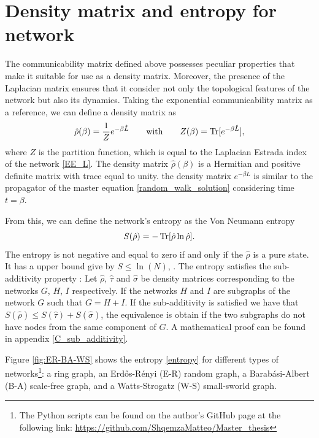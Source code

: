 \section{Density matrix and entropy for network}
The communicability matrix defined above possesses peculiar properties that make it suitable for use as a density matrix. Moreover, the presence of the Laplacian matrix ensures that it consider not only the topological features of the network but also its dynamics. Taking the exponential communicability matrix as a reference, we can define a density matrix as
\begin{equation}\label{density_matrix}
    \hat \rho(\beta) = \frac{1}{Z} e^{-\beta \hat L} \qquad \text{with} \qquad Z(\beta) = \operatorname{Tr}[e^{-\beta \hat L}],
\end{equation}
where $Z$ is the partition function, which is equal to the Laplacian Estrada index of the network \eqref{EE_L}.
The density matrix $\hat \rho(\beta)$ is a Hermitian and positive definite matrix with trace equal to unity. 
the density matrix $e^{-\beta L}$ is similar to the propagator of the master equation \eqref{random_walk_solution} considering time $t = \beta$.

From this, we can define the network's entropy as the Von Neumann entropy
\begin{equation} \label{entropy}
    S(\hat\rho) = -\operatorname{Tr}[\hat \rho \ln \hat \rho].
\end{equation}
The entropy is not negative and equal to zero if and only if the $\hat\rho$ is a pure state. It has a upper bound give by $S \leq \ln(N)$,  \cite{Nielsen_Chuang_2010}.
The entropy satisfies the sub-additivity property \cite{De_Domenico_2016}:
Let $\hat\rho$, $\hat\tau$ and $\hat\sigma$ be density matrices corresponding to the networks $G$, $H$, $I$ respectively. If the networks $H$ and $I$ are subgraphs of the network $G$ such that $G = H + I$.
If the sub-additivity is satisfied we have that $S(\hat\rho) \leq S(\hat\tau) + S(\hat\sigma)$, the equivalence is obtain if the two subgraphs do not have nodes from the same component of $G$. A mathematical proof can be found in appendix \ref{C_sub_additivity}.

Figure \ref{fig:ER-BA-WS} shows the entropy \eqref{entropy} for different types of networks\footnote{The Python scripts can be found on the author's GitHub page at the following link: \url{https://github.com/ShqemzaMatteo/Master_thesis}}: a ring graph, an Erd\H{o}s-Rényi (E-R) random graph, a Barab\'asi-Albert (B-A) scale-free graph, and a Watts-Strogatz (W-S) small-sworld graph.

